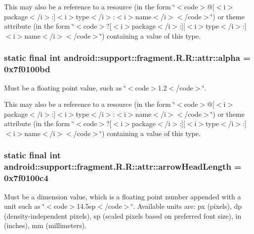 This may also be a reference to a resource (in the form \char`\"{}$<$code$>$@\mbox{[}$<$i$>$package$<$/i$>$:\mbox{]}$<$i$>$type$<$/i$>$:$<$i$>$name$<$/i$>$$<$/code$>$\char`\"{}) or theme attribute (in the form \char`\"{}$<$code$>$?\mbox{[}$<$i$>$package$<$/i$>$:\mbox{]}\mbox{[}$<$i$>$type$<$/i$>$:\mbox{]}$<$i$>$name$<$/i$>$$<$/code$>$\char`\"{}) containing a value of this type. \hypertarget{classandroid_1_1support_1_1fragment_1_1_r_1_1attr_47c662ed448a1497474561ead4d6713e}{
\subsubsection[{alpha}]{\setlength{\rightskip}{0pt plus 5cm}static final int android::support::fragment.R.R::attr::alpha = 0x7f0100bd}}
\label{classandroid_1_1support_1_1fragment_1_1_r_1_1attr_47c662ed448a1497474561ead4d6713e}


Must be a floating point value, such as \char`\"{}$<$code$>$1.2$<$/code$>$\char`\"{}. 

This may also be a reference to a resource (in the form \char`\"{}$<$code$>$@\mbox{[}$<$i$>$package$<$/i$>$:\mbox{]}$<$i$>$type$<$/i$>$:$<$i$>$name$<$/i$>$$<$/code$>$\char`\"{}) or theme attribute (in the form \char`\"{}$<$code$>$?\mbox{[}$<$i$>$package$<$/i$>$:\mbox{]}\mbox{[}$<$i$>$type$<$/i$>$:\mbox{]}$<$i$>$name$<$/i$>$$<$/code$>$\char`\"{}) containing a value of this type. \hypertarget{classandroid_1_1support_1_1fragment_1_1_r_1_1attr_e198e69accff24a7231165b539222483}{
\subsubsection[{arrowHeadLength}]{\setlength{\rightskip}{0pt plus 5cm}static final int android::support::fragment.R.R::attr::arrowHeadLength = 0x7f0100c4}}
\label{classandroid_1_1support_1_1fragment_1_1_r_1_1attr_e198e69accff24a7231165b539222483}


Must be a dimension value, which is a floating point number appended with a unit such as \char`\"{}$<$code$>$14.5sp$<$/code$>$\char`\"{}. Available units are: px (pixels), dp (density-independent pixels), sp (scaled pixels based on preferred font size), in (inches), mm (millimeters). 

